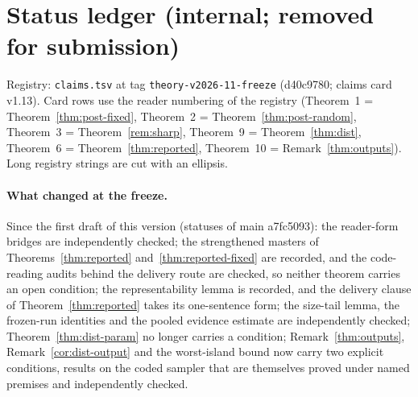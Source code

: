 \ifshowstatus
\section{Status ledger (internal; removed for submission)}\label{app:status}

Registry: \texttt{claims.tsv} at tag \texttt{theory-v2026-11-freeze} (d40c9780; claims card v1.13). Card rows use the
reader numbering of the registry (Theorem~1 = Theorem~\ref{thm:post-fixed}, Theorem~2 = Theorem~\ref{thm:post-random},
Theorem~3 = Theorem~\ref{rem:sharp}, Theorem~9 = Theorem~\ref{thm:dist}, Theorem~6 = Theorem~\ref{thm:reported},
Theorem~10 = Remark~\ref{thm:outputs}). Long registry strings are cut with an ellipsis.


\paragraph{What changed at the freeze.} Since the first draft of this version (statuses of main a7fc5093): the
reader-form bridges are independently checked; the strengthened masters of Theorems~\ref{thm:reported}
and~\ref{thm:reported-fixed} are recorded, and the code-reading audits behind the delivery route are checked, so neither
theorem carries an open condition; the representability lemma is recorded, and the delivery clause of
Theorem~\ref{thm:reported} takes its one-sentence form; the size-tail lemma, the frozen-run identities and the pooled
evidence estimate are independently checked; Theorem~\ref{thm:dist-param} no longer carries a condition;
Remark~\ref{thm:outputs}, Remark~\ref{cor:dist-output} and the worst-island bound now carry two explicit conditions,
results on the coded sampler that are themselves proved under named premises and independently checked.

